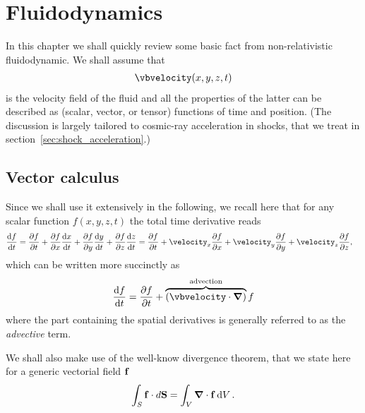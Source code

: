 \chapter{Fluidodynamics}\label{chap:fluidodynamics}

In this chapter we shall quickly review some basic fact from non-relativistic
fluidodynamic. We shall assume that
\begin{align*}
  \vbvelocity(x, y, z, t)
\end{align*}
is the velocity field of the fluid and all the properties of the latter can be
described as (scalar, vector, or tensor) functions of time and position.
(The discussion is largely tailored to cosmic-ray acceleration in shocks, that we
treat in section~\ref{sec:shock_acceleration}.)



\section{Vector calculus}

Since we shall use it extensively in the following, we recall here that for any
scalar function $f(x, y, z, t)$ the total time derivative reads
\begin{align*}
  \dv{f}{t} &= \pdv{f}{t} + \pdv{f}{x} \dv{x}{t} +
  \pdv{f}{y} \dv{y}{t} + \pdv{f}{z} \dv{z}{t} =
  \pdv{f}{t} + \velocity_x \pdv{f}{x} + \velocity_y \pdv{f}{y} + \velocity_z \pdv{f}{z},
\end{align*}
which can be written more succinctly as
\begin{align}
  \dv{f}{t} = \pdv{f}{t} + \overbrace{(\vbvelocity \cdot \grad)}^{\text{advection}} f
\end{align}
where the part containing the spatial derivatives is generally referred to as the
\emph{advective} term.

We shall also make use of the well-know divergence theorem, that we state here
for a generic vectorial field $\vb{f}$
\begin{align}\label{eq:divergence_theorem}
  \int_S \vb{f} \cdot d\vb{S} = \int_V \vnabla \cdot \vb{f} \dd{V}.
\end{align}



